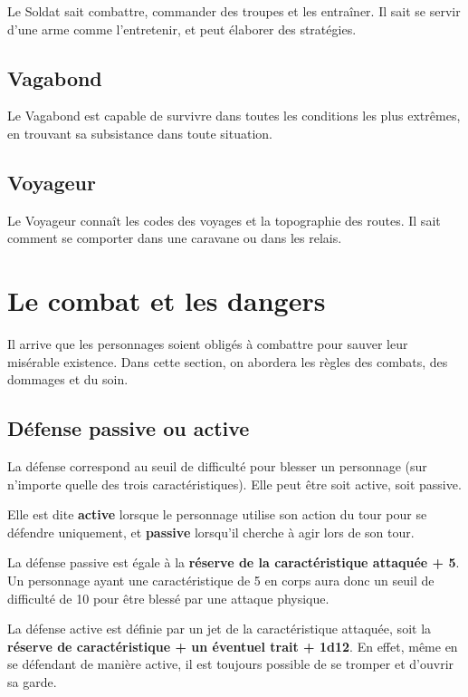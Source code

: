 \documentclass[a4paper,10pt,twoside,twocolumn,openany,bg=print]{dndbook}
\begin{document}
Le Soldat sait combattre, commander des troupes et les entraîner. Il sait se servir d'une arme comme l'entretenir, et peut élaborer des stratégies.

\section*{Vagabond}

Le Vagabond est capable de survivre dans toutes les conditions les plus extrêmes, en trouvant sa subsistance dans toute situation.

\section*{Voyageur}

Le Voyageur connaît les codes des voyages et la topographie des routes. Il sait comment se comporter dans une caravane ou dans les relais.

\newpage

\chapter{Le combat et les dangers}

Il arrive que les personnages soient obligés à combattre pour sauver leur misérable existence. Dans cette section, on abordera les règles des combats, des dommages et du soin.

\section{Défense passive ou active}

La défense correspond au seuil de difficulté pour blesser un personnage (sur n'importe quelle des trois caractéristiques). Elle peut être soit active, soit passive.

Elle est dite \textbf{active} lorsque le personnage utilise son action du tour pour se défendre uniquement, et \textbf{passive} lorsqu'il cherche à agir lors de son tour.

La défense passive est égale à la \textbf{réserve de la caractéristique attaquée + 5}. Un personnage ayant une caractéristique de 5 en corps aura donc un seuil de difficulté de 10 pour être blessé par une attaque physique.

La défense active est définie par un jet de la caractéristique attaquée, soit la \textbf{réserve de caractéristique + un éventuel trait + 1d12}. En effet, même en se défendant de manière active, il est toujours possible de se tromper et d'ouvrir sa garde.
\end{document}
